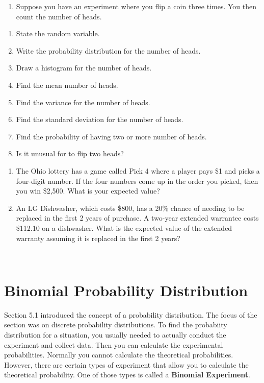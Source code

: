 \documentclass[
]{book}
\providecommand{\tightlist}{%
  \setlength{\itemsep}{0pt}\setlength{\parskip}{0pt}}
\begin{document}
\begin{enumerate}
\def\labelenumi{\arabic{enumi}.}
\setcounter{enumi}{1}
\tightlist
\item
  Suppose you have an experiment where you flip a coin three times. You then count the number of heads.
\end{enumerate}

\begin{enumerate}
\def\labelenumi{\alph{enumi}.}
\tightlist
\item
  State the random variable.
\item
  Write the probability distribution for the number of heads.
\item
  Draw a histogram for the number of heads.
\item
  Find the mean number of heads.
\item
  Find the variance for the number of heads.
\item
  Find the standard deviation for the number of heads.
\item
  Find the probability of having two or more number of heads.
\item
  Is it unusual for to flip two heads?
\end{enumerate}

\begin{enumerate}
\def\labelenumi{\arabic{enumi}.}
\setcounter{enumi}{2}
\item
  The Ohio lottery has a game called Pick 4 where a player pays \$1 and picks a four-digit number. If the four numbers come up in the order you picked, then you win \$2,500. What is your expected value?
\item
  An LG Dishwasher, which costs \$800, has a 20\% chance of needing to be replaced in the first 2 years of purchase. A two-year extended warrantee costs \$112.10 on a dishwasher. What is the expected value of the extended warranty assuming it is replaced in the first 2 years?
\end{enumerate}

\textbf{\\
}

\hypertarget{binomial-probability-distribution}{%
\section{Binomial Probability Distribution}\label{binomial-probability-distribution}}

Section 5.1 introduced the concept of a probability distribution. The focus of the section was on discrete probability distributions. To find the probabiity distribution for a situation, you usually needed to actually conduct the experiment and collect data. Then you can calculate the experimental probabilities. Normally you cannot calculate the theoretical probabilities. However, there are certain types of experiment that allow you to calculate the theoretical probability. One of those types is called a \textbf{Binomial Experiment}.
\end{document}
